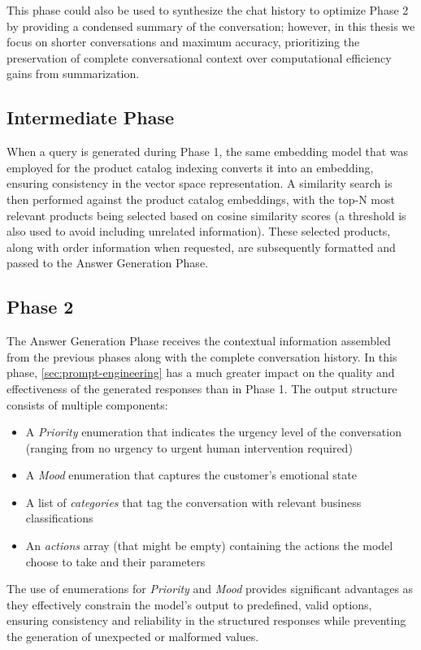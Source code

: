This phase could also be used to synthesize the chat history to optimize Phase 2 by providing a condensed summary of the conversation; however, in this thesis we focus on shorter conversations and maximum accuracy, prioritizing the preservation of complete conversational context over computational efficiency gains from summarization.

\subsection{Intermediate Phase}

When a query is generated during Phase 1, the same embedding model that was employed for the product catalog indexing converts it into an embedding, ensuring consistency in the vector space representation.
A similarity search is then performed against the product catalog embeddings, with the top-N most relevant products being selected based on cosine similarity scores (a threshold is also used to avoid including unrelated information).
These selected products, along with order information when requested, are subsequently formatted and passed to the Answer Generation Phase.

\subsection{Phase 2}

The Answer Generation Phase receives the contextual information assembled from the previous phases along with the complete conversation history.
In this phase, \cref{sec:prompt-engineering} has a much greater impact on the quality and effectiveness of the generated responses than in Phase 1.
The output structure consists of multiple components:
\begin{itemize}
    \item A \textit{Priority} enumeration that indicates the urgency level of the conversation (ranging from no urgency to urgent human intervention required)
    \item A \textit{Mood} enumeration that captures the customer's emotional state
    \item A list of \textit{categories} that tag the conversation with relevant business classifications
    \item An \textit{actions} array (that might be empty) containing the actions the model choose to take and their parameters
\end{itemize}
The use of enumerations for \textit{Priority} and \textit{Mood} provides significant advantages as they effectively constrain the model's output to predefined, valid options, ensuring consistency and reliability in the structured responses while preventing the generation of unexpected or malformed values.

